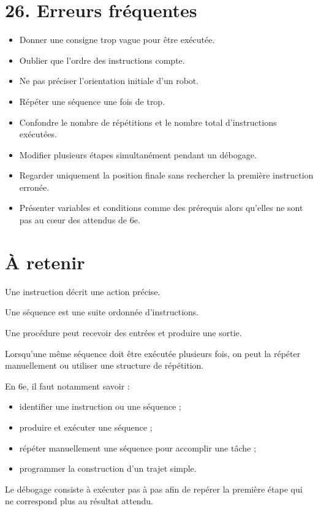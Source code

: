 \section{26. Erreurs fréquentes}

\begin{itemize}
\item Donner une consigne trop vague pour être exécutée.
\item Oublier que l'ordre des instructions compte.
\item Ne pas préciser l'orientation initiale d'un robot.
\item Répéter une séquence une fois de trop.
\item Confondre le nombre de répétitions et le nombre total d'instructions exécutées.
\item Modifier plusieurs étapes simultanément pendant un débogage.
\item Regarder uniquement la position finale sans rechercher la première instruction erronée.
\item Présenter variables et conditions comme des prérequis alors qu'elles ne sont pas au cœur des attendus de 6e.
\end{itemize}

\section{À retenir}

\begin{aretenir}
Une instruction décrit une action précise.

Une séquence est une suite ordonnée d'instructions.

Une procédure peut recevoir des entrées et produire une sortie.

Lorsqu'une même séquence doit être exécutée plusieurs fois, on peut la répéter manuellement ou utiliser une structure de répétition.

En 6e, il faut notamment savoir :
\begin{itemize}
\item identifier une instruction ou une séquence ;
\item produire et exécuter une séquence ;
\item répéter manuellement une séquence pour accomplir une tâche ;
\item programmer la construction d'un trajet simple.
\end{itemize}

Le débogage consiste à exécuter pas à pas afin de repérer la première étape qui ne correspond plus au résultat attendu.
\end{aretenir}
